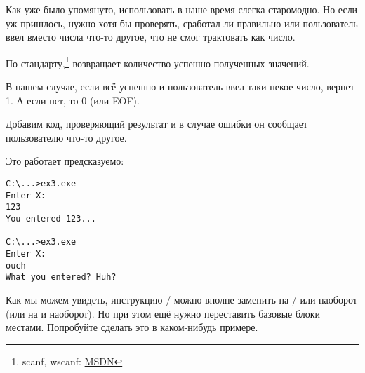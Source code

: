 
Как уже было упомянуто, использовать \scanf в наше время слегка старомодно. 
Но если уж пришлось, нужно хотя бы проверять, сработал ли \scanf 
правильно или пользователь ввел вместо числа что-то другое, что \scanf не смог трактовать как число.



По стандарту,\scanf\footnote{scanf, wscanf: \href{http://go.yurichev.com/17255}{MSDN}} возвращает количество успешно полученных значений.

В нашем случае, если всё успешно и пользователь ввел таки некое число, \scanf вернет 1. А если нет, то 0 (или \ac{EOF}).

Добавим код, проверяющий результат \scanf и в случае ошибки он сообщает пользователю что-то другое.

Это работает предсказуемо:

\begin{lstlisting}
C:\...>ex3.exe
Enter X:
123
You entered 123...

C:\...>ex3.exe
Enter X:
ouch
What you entered? Huh?
\end{lstlisting}






\subsectionold{\Exercise}

Как мы можем увидеть, инструкцию / можно вполне заменить на / или наоборот 
(или  на  и наоборот).
Но при этом ещё нужно переставить базовые блоки местами.
Попробуйте сделать это в каком-нибудь примере.
